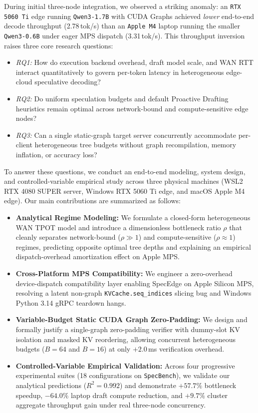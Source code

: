 \documentclass[10pt,conference]{IEEEtran}
\begin{document}
During initial three-node integration, we observed a striking anomaly: an \texttt{RTX 5060 Ti} edge running \texttt{Qwen3-1.7B} with CUDA Graphs achieved \emph{lower} end-to-end decode throughput (2.78\,tok/s) than an \texttt{Apple M4} laptop running the smaller \texttt{Qwen3-0.6B} under eager MPS dispatch (3.31\,tok/s). This throughput inversion raises three core research questions:
\begin{itemize}
  \item \emph{RQ1:} How do execution backend overhead, draft model scale, and WAN RTT interact quantitatively to govern per-token latency in heterogeneous edge-cloud speculative decoding?
  \item \emph{RQ2:} Do uniform speculation budgets and default Proactive Drafting heuristics remain optimal across network-bound and compute-sensitive edge nodes?
  \item \emph{RQ3:} Can a single static-graph target server concurrently accommodate per-client heterogeneous tree budgets without graph recompilation, memory inflation, or accuracy loss?
\end{itemize}

To answer these questions, we conduct an end-to-end modeling, system design, and controlled-variable empirical study across three physical machines (WSL2 RTX 4080 SUPER server, Windows RTX 5060 Ti edge, and macOS Apple M4 edge). Our main contributions are summarized as follows:
\begin{itemize}
  \item \textbf{Analytical Regime Modeling:} We formulate a closed-form heterogeneous WAN TPOT model and introduce a dimensionless bottleneck ratio $\rho$ that cleanly separates network-bound ($\rho \gg 1$) and compute-sensitive ($\rho \approx 1$) regimes, predicting opposite optimal tree depths and explaining an empirical dispatch-overhead amortization effect on Apple MPS.
  \item \textbf{Cross-Platform MPS Compatibility:} We engineer a zero-overhead device-dispatch compatibility layer enabling SpecEdge on Apple Silicon MPS, resolving a latent non-graph \texttt{KVCache.seq\_indices} slicing bug and Windows Python 3.14 gRPC teardown hangs.
  \item \textbf{Variable-Budget Static CUDA Graph Zero-Padding:} We design and formally justify a single-graph zero-padding verifier with dummy-slot KV isolation and masked KV reordering, allowing concurrent heterogeneous budgets ($B{=}64$ and $B{=}16$) at only $+2.0$\,ms verification overhead.
  \item \textbf{Controlled-Variable Empirical Validation:} Across four progressive experimental suites (18 configurations on \texttt{SpecBench}), we validate our analytical predictions ($R^2{=}0.992$) and demonstrate $+57.7\%$ bottleneck speedup, $-64.0\%$ laptop draft compute reduction, and $+9.7\%$ cluster aggregate throughput gain under real three-node concurrency.
\end{itemize}
\end{document}
